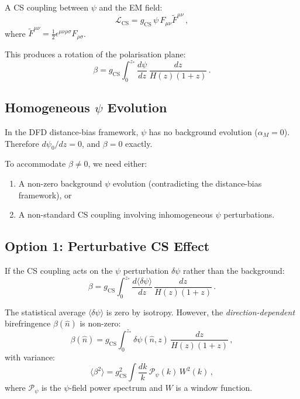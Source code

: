 \documentclass[11pt,a4paper]{article}
\begin{document}
A CS coupling between $\psi$ and the EM field:
\begin{equation}
\mathcal{L}_{\mathrm{CS}} = g_{\mathrm{CS}}\,\psi\,F_{\mu\nu}\tilde{F}^{\mu\nu}\,,
\end{equation}
where $\tilde{F}^{\mu\nu} = \frac{1}{2}\epsilon^{\mu\nu\rho\sigma}F_{\rho\sigma}$.

This produces a rotation of the polarisation plane:
\begin{equation}
\beta = g_{\mathrm{CS}} \int_0^{z_*} \frac{d\psi}{dz}\,\frac{dz}{H(z)(1+z)}\,.
\end{equation}

\subsection{Homogeneous $\psi$ Evolution}

In the DFD distance-bias framework, $\psi$ has no background evolution ($\alpha_M = 0$). Therefore $d\psi_0/dz = 0$, and $\beta = 0$ exactly.

To accommodate $\beta \neq 0$, we need either:
\begin{enumerate}
\item A non-zero background $\psi$ evolution (contradicting the distance-bias framework), or
\item A non-standard CS coupling involving inhomogeneous $\psi$ perturbations.
\end{enumerate}

\subsection{Option 1: Perturbative CS Effect}

If the CS coupling acts on the $\psi$ perturbation $\delta\psi$ rather than the background:
\begin{equation}
\beta = g_{\mathrm{CS}} \int_0^{z_*} \frac{d\langle\delta\psi\rangle}{dz}\,\frac{dz}{H(z)(1+z)}\,.
\end{equation}

The statistical average $\langle\delta\psi\rangle$ is zero by isotropy. However, the \emph{direction-dependent} birefringence $\beta(\hat{n})$ is non-zero:
\begin{equation}
\beta(\hat{n}) = g_{\mathrm{CS}} \int_0^{z_*} \delta\psi(\hat{n}, z)\,\frac{dz}{H(z)(1+z)}\,,
\end{equation}
with variance:
\begin{equation}
\langle\beta^2\rangle = g_{\mathrm{CS}}^2 \int \frac{dk}{k}\,\mathcal{P}_\psi(k)\,W^2(k)\,,
\end{equation}
where $\mathcal{P}_\psi$ is the $\psi$-field power spectrum and $W$ is a window function.
\end{document}
